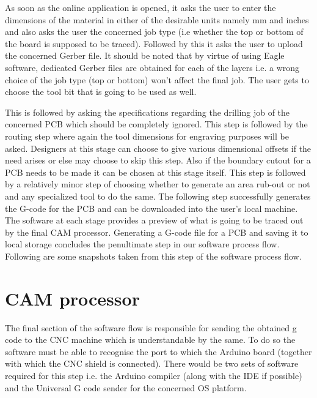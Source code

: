 As soon as the online application is opened, it asks the user to enter the dimensions of the material in either of the desirable units namely mm and inches and also asks the user the concerned job type (i.e whether the top or bottom of the board is supposed to be traced). Followed by this it asks the user to upload the concerned Gerber file. It should be noted that by virtue of using Eagle software, dedicated Gerber files are obtained for each of the layers i.e. a wrong choice of the job type (top or bottom) won’t affect the final job. The user gets to choose the tool bit that is going to be used as well. \par

This is followed by asking the specifications regarding the drilling job of the concerned PCB which should be completely ignored. This step is followed by the routing step where again the tool dimensions for engraving purposes will be asked. Designers at this stage can choose to give various dimensional offsets if the need arises or else may choose to skip this step. Also if the boundary cutout for a PCB needs to be made it can be chosen at this stage itself. This step is followed by a relatively minor step of choosing whether to generate an area rub-out or not and any specialized tool to do the same. The following step successfully generates the G-code for the PCB and can be downloaded into the user’s local machine. The software at each stage provides a preview of what is going to be traced out by the final CAM processor. Generating a G-code file for a PCB and saving it to local storage concludes the penultimate step in our software process flow. Following are some snapshots taken from this step of the software process flow. \par


\section{CAM processor}

The final section of the software flow is responsible for sending the obtained g code to the CNC machine which is understandable by the same. To do so the software must be able to recognise the port to which the Arduino board (together with which the CNC shield is connected). There would be two sets of software required for this step i.e. the Arduino compiler (along with the IDE if possible) and the Universal G code sender for the concerned OS platform. \par

